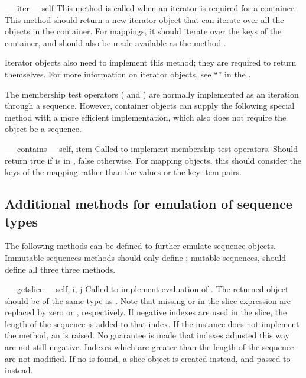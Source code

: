 \begin{methoddesc}{__iter__}{self}
This method is called when an iterator is required for a container.
This method should return a new iterator object that can iterate over
all the objects in the container.  For mappings, it should iterate
over the keys of the container, and should also be made available as
the method .

Iterator objects also need to implement this method; they are required
to return themselves.  For more information on iterator objects, see
``'' in the
.
\end{methoddesc}

The membership test operators ( and ) are
normally implemented as an iteration through a sequence.  However,
container objects can supply the following special method with a more
efficient implementation, which also does not require the object be a
sequence.

\begin{methoddesc}{__contains__}{self, item}
Called to implement membership test operators.  Should return true if
 is in , false otherwise.  For mapping objects,
this should consider the keys of the mapping rather than the values or
the key-item pairs.
\end{methoddesc}


\subsection{Additional methods for emulation of sequence types
  \label{sequence-methods}}

The following methods can be defined to further emulate sequence
objects.  Immutable sequences methods should only define
; mutable sequences, should define all three
three methods.

\begin{methoddesc}{__getslice__}{self, i, j}
Called to implement evaluation of .
The returned object should be of the same type as .  Note
that missing  or  in the slice expression are replaced
by zero or , respectively.  If negative indexes are
used in the slice, the length of the sequence is added to that index.
If the instance does not implement the  method, an
 is raised.
No guarantee is made that indexes adjusted this way are not still
negative.  Indexes which are greater than the length of the sequence
are not modified.
If no  is found, a slice
object is created instead, and passed to  instead.
\end{methoddesc}

